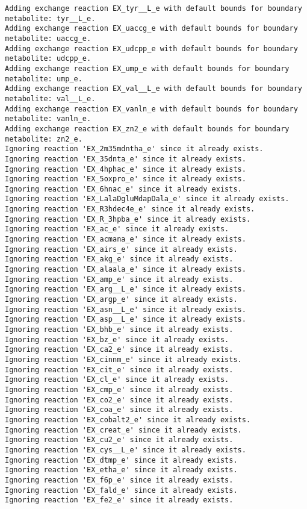 \documentclass[
  letterpaper,
  DIV=11,
  numbers=noendperiod]{scrartcl}
\begin{document}
\begin{verbatim}
Adding exchange reaction EX_tyr__L_e with default bounds for boundary metabolite: tyr__L_e.
Adding exchange reaction EX_uaccg_e with default bounds for boundary metabolite: uaccg_e.
Adding exchange reaction EX_udcpp_e with default bounds for boundary metabolite: udcpp_e.
Adding exchange reaction EX_ump_e with default bounds for boundary metabolite: ump_e.
Adding exchange reaction EX_val__L_e with default bounds for boundary metabolite: val__L_e.
Adding exchange reaction EX_vanln_e with default bounds for boundary metabolite: vanln_e.
Adding exchange reaction EX_zn2_e with default bounds for boundary metabolite: zn2_e.
Ignoring reaction 'EX_2m35mdntha_e' since it already exists.
Ignoring reaction 'EX_35dnta_e' since it already exists.
Ignoring reaction 'EX_4hphac_e' since it already exists.
Ignoring reaction 'EX_5oxpro_e' since it already exists.
Ignoring reaction 'EX_6hnac_e' since it already exists.
Ignoring reaction 'EX_LalaDgluMdapDala_e' since it already exists.
Ignoring reaction 'EX_R3hdec4e_e' since it already exists.
Ignoring reaction 'EX_R_3hpba_e' since it already exists.
Ignoring reaction 'EX_ac_e' since it already exists.
Ignoring reaction 'EX_acmana_e' since it already exists.
Ignoring reaction 'EX_airs_e' since it already exists.
Ignoring reaction 'EX_akg_e' since it already exists.
Ignoring reaction 'EX_alaala_e' since it already exists.
Ignoring reaction 'EX_amp_e' since it already exists.
Ignoring reaction 'EX_arg__L_e' since it already exists.
Ignoring reaction 'EX_argp_e' since it already exists.
Ignoring reaction 'EX_asn__L_e' since it already exists.
Ignoring reaction 'EX_asp__L_e' since it already exists.
Ignoring reaction 'EX_bhb_e' since it already exists.
Ignoring reaction 'EX_bz_e' since it already exists.
Ignoring reaction 'EX_ca2_e' since it already exists.
Ignoring reaction 'EX_cinnm_e' since it already exists.
Ignoring reaction 'EX_cit_e' since it already exists.
Ignoring reaction 'EX_cl_e' since it already exists.
Ignoring reaction 'EX_cmp_e' since it already exists.
Ignoring reaction 'EX_co2_e' since it already exists.
Ignoring reaction 'EX_coa_e' since it already exists.
Ignoring reaction 'EX_cobalt2_e' since it already exists.
Ignoring reaction 'EX_creat_e' since it already exists.
Ignoring reaction 'EX_cu2_e' since it already exists.
Ignoring reaction 'EX_cys__L_e' since it already exists.
Ignoring reaction 'EX_dtmp_e' since it already exists.
Ignoring reaction 'EX_etha_e' since it already exists.
Ignoring reaction 'EX_f6p_e' since it already exists.
Ignoring reaction 'EX_fald_e' since it already exists.
Ignoring reaction 'EX_fe2_e' since it already exists.

\end{verbatim}
\end{document}
